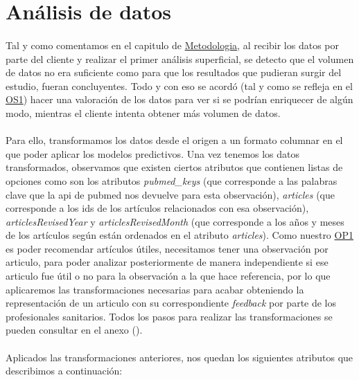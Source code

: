 \section{Análisis de datos}
\label{section:analisis_datos}

\paragraph{}
Tal y como comentamos en el capitulo de \hyperref[chapter:metodologia]{Metodologia}, al recibir los datos por parte del cliente y realizar el primer análisis superficial, se detecto que el volumen de datos no era suficiente como para que los resultados que pudieran surgir del estudio, fueran concluyentes. Todo y con eso se acordó (tal y como se refleja en el \hyperref[os:OS1]{OS1}) hacer una valoración de los datos para ver si se podrían enriquecer de algún modo, mientras el cliente intenta obtener más volumen de datos.

\paragraph{}
Para ello, transformamos los datos desde el origen a un formato columnar en el que poder aplicar los modelos predictivos. Una vez tenemos los datos transformados, observamos que existen ciertos atributos que contienen listas de opciones como son los atributos \textit{pubmed\_keys} (que corresponde a las palabras clave que la api de pubmed nos devuelve para esta observación), \textit{articles} (que corresponde a los ids de los artículos relacionados con esa observación), \textit{articlesRevisedYear} y \textit{articlesRevisedMonth} (que corresponde a los años y meses de los artículos según están ordenados en el atributo \textit{articles}). Como nuestro \hyperref[op:OP1]{OP1} es poder recomendar artículos útiles, necesitamos tener una observación por articulo, para poder analizar posteriormente de manera independiente si ese articulo fue útil o no para la observación a la que hace referencia, por lo que aplicaremos las transformaciones necesarias para acabar obteniendo la representación de un articulo con su correspondiente \textit{feedback} por parte de los profesionales sanitarios. Todos los pasos para realizar las transformaciones se pueden consultar en el anexo ().

\paragraph{}
Aplicados las transformaciones anteriores, nos quedan los siguientes atributos que describimos a continuación:

